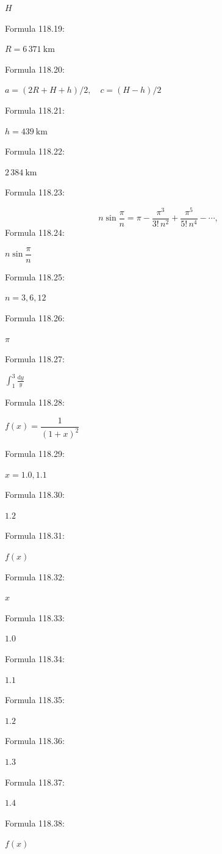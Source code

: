\documentclass[11pt]{article}
\begin{document}
$H$\par
\noindent Formula 118.19:\par
$R=6\,371\ \mathrm{km}$\par
\noindent Formula 118.20:\par
$a=(2R+H+h)/2,\quad c=(H-h)/2$\par
\noindent Formula 118.21:\par
$h=439\ \mathrm{km}$\par
\noindent Formula 118.22:\par
$2\,384\ \mathrm{km}$\par
\noindent Formula 118.23:\par
\[
n\sin\frac\pi n=\pi-\frac{\pi^3}{3!\,n^2}+\frac{\pi^5}{5!\,n^4}-\cdots,
\]
\noindent Formula 118.24:\par
$n\sin\dfrac\pi n$\par
\noindent Formula 118.25:\par
$n=3,6,12$\par
\noindent Formula 118.26:\par
$\pi$\par
\noindent Formula 118.27:\par
$\displaystyle\int_1^3\frac{\mathrm{d}y}{y}$\par
\noindent Formula 118.28:\par
$f(x)=\dfrac1{(1+x)^2}$\par
\noindent Formula 118.29:\par
$x=1.0,1.1$\par
\noindent Formula 118.30:\par
$1.2$\par
\noindent Formula 118.31:\par
$f(x)$\par
\noindent Formula 118.32:\par
$x$\par
\noindent Formula 118.33:\par
$1.0$\par
\noindent Formula 118.34:\par
$1.1$\par
\noindent Formula 118.35:\par
$1.2$\par
\noindent Formula 118.36:\par
$1.3$\par
\noindent Formula 118.37:\par
$1.4$\par
\noindent Formula 118.38:\par
$f(x)$\par
\end{document}
